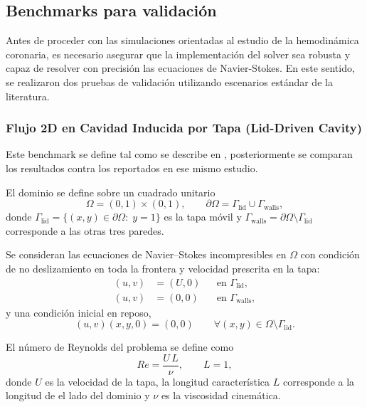 \documentclass[12pt, letterpaper]{article}
\begin{document}
\subsection{Benchmarks para validación}

Antes de proceder con las simulaciones orientadas al estudio de la hemodinámica coronaria, es necesario asegurar que la implementación del solver sea robusta y capaz de resolver con precisión las ecuaciones de Navier-Stokes. En este sentido, se realizaron dos pruebas de validación utilizando escenarios estándar de la literatura.

\subsubsection{Flujo 2D en Cavidad Inducida por Tapa (Lid-Driven Cavity)} \label{sec:ldc}

Este benchmark se define tal como se describe en \cite{ghia_high-re_1982}, posteriormente se comparan los resultados contra los reportados en ese mismo estudio.

El dominio se define sobre un cuadrado unitario
\begin{equation}
  \Omega = (0,1)\times(0,1),
  \qquad \partial\Omega = \Gamma_{\mathrm{lid}}\cup \Gamma_{\mathrm{walls}},
\end{equation}
\noindent donde $\Gamma_{\mathrm{lid}}=\{(x,y)\in\partial\Omega:\; y=1\}$ es la tapa móvil y $\Gamma_{\mathrm{walls}}=\partial\Omega\setminus\Gamma_{\mathrm{lid}}$ corresponde a las otras tres paredes.

Se consideran las ecuaciones de Navier--Stokes incompresibles en $\Omega$ con condición de no deslizamiento en toda la frontera y velocidad prescrita en la tapa:
\begin{equation}
  \label{eq:ldc_bc}
  \begin{aligned}
    (u,v) &= (U,0) && \text{en } \Gamma_{\mathrm{lid}},\\
    (u,v) &= (0,0) && \text{en } \Gamma_{\mathrm{walls}},
  \end{aligned}
\end{equation}
\noindent y una condición inicial en reposo,
\begin{equation}
  \label{eq:ldc_ic}
  (u,v)(x,y,0) = (0,0) \qquad \forall (x,y)\in\Omega\setminus\Gamma_{\mathrm{lid}}.
\end{equation}

El número de Reynolds del problema se define como
\begin{equation}
  \label{eq:ldc_re}
  Re = \frac{U\,L}{\nu}, \qquad L=1,
\end{equation}
\noindent donde $U$ es la velocidad de la tapa, la longitud característica $L$ corresponde a la longitud de el lado del dominio y $\nu$ es la viscosidad cinemática.
\end{document}
